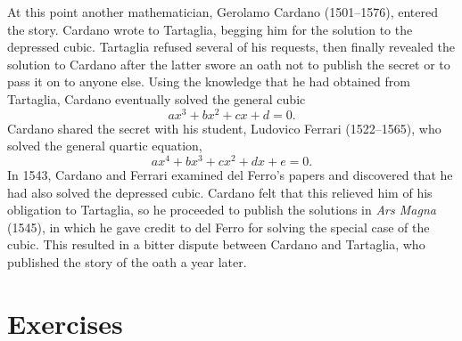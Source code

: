{At this point another mathematician, Gerolamo Cardano (1501--1576), entered the story.  Cardano wrote to Tartaglia, begging him for the solution to the depressed cubic.  Tartaglia refused several of his requests, then finally revealed the solution to Cardano after the latter swore an oath not to publish the secret or to pass it on to anyone else. Using the knowledge that he had obtained from Tartaglia, Cardano eventually solved the general cubic 
\[
a x^3 + bx^2 +cx +d = 0.
\]
Cardano shared the secret with his student, Ludovico Ferrari (1522--1565), who solved the general quartic equation, 
\[
a x^4 + b x^3 + cx^2 + d x + e =0.
\]
In 1543, Cardano and Ferrari examined del Ferro's papers and discovered that he had also solved the depressed cubic.  Cardano felt that this relieved him of his obligation to Tartaglia, so he proceeded to publish the solutions in {\it Ars Magna} (1545), in which he gave credit to del Ferro for solving the special case of the cubic.  This resulted in a bitter dispute between Cardano and Tartaglia, who published the story of the oath a year later.
\histbox
} 
 

\section*{Exercises}
\exrule

